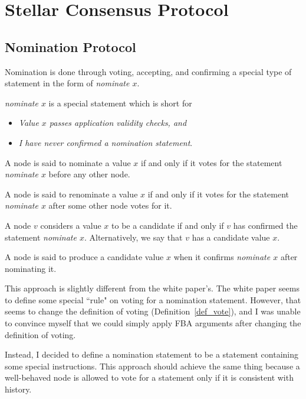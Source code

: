 \section{Stellar Consensus Protocol}
\subsection{Nomination Protocol}

Nomination is done through voting, accepting, and confirming a special type of statement in the form of \textit{nominate $x$}.

\begin{defn}
    \textit{nominate $x$} is a special statement which is short for
    \begin{itemize}
        \item
            \textit{Value $x$ passes application validity checks, and}
        \item
            \textit{I have never confirmed a nomination statement}.
    \end{itemize}
\end{defn}

\begin{defn}[Nominate]
    A node is said to nominate a value $x$ if and only if it votes for the statement \textit{nominate $x$} before any other node.
\end{defn}

\begin{defn}[Renominate]
    A node is said to renominate a value $x$ if and only if it votes for the statement \textit{nominate $x$} after some other node votes for it.
\end{defn}

\begin{defn}[Candidate]
    A node $v$ considers a value $x$ to be a candidate if and only if $v$ has confirmed the statement \textit{nominate $x$}.
    Alternatively, we say that $v$ has a candidate value $x$.
\end{defn}

\begin{defn}[Produce]
    A node is said to produce a candidate value $x$ when it confirms \textit{nominate $x$} after nominating it.
\end{defn}

\begin{rem}
    This approach is slightly different from the white paper's.
    The white paper seems to define some special ``rule" on voting for a nomination statement.
    However, that seems to change the definition of voting (Definition~\ref{def_vote}), and I was unable to convince myself that we could simply apply FBA arguments after changing the definition of voting.

    Instead, I decided to define a nomination statement to be a statement containing some special instructions.
    This approach should achieve the same thing because a well-behaved node is allowed to vote for a statement only if it is consistent with history.
\end{rem}

